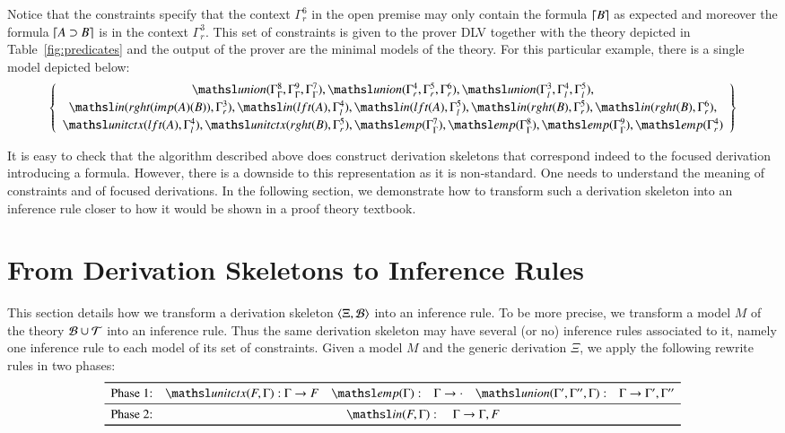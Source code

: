 \documentclass[a4paper,10pt]{article}
\newcommand\thSeq{\ensuremath{\Tscr}}
\newcommand{\elin}[2]{\ensuremath{{\tsl{unitctx}(\ensuremath{#1}, \ensuremath{#2})}}}
\newcommand{\emp}[1]{\ensuremath{{\tsl{emp}(\ensuremath{#1})}}}
\newcommand{\union}[3]{\ensuremath{{\tsl{union}(\ensuremath{#1},\ensuremath{#2},\ensuremath{ #3})}}}
\newcommand{\In}[2]{\ensuremath{\tsl{in}(\ensuremath{#1},\ensuremath{#2})}}
\begin{document}
Notice that the constraints specify that the context $\Gamma^6_r$ in the open premise 
may only contain the formula $\lceil B \rceil$ as expected and moreover the formula $\lceil A \supset B \rceil$ is in the context
$\Gamma^3_r$. This set of constraints is given to the prover DLV together with the theory depicted in Table~\ref{fig:predicates} and the 
output of the prover are the minimal models of the theory. For this particular example, there is a single model depicted below:
\[
 \left\{\begin{array}{c}
\union{\Gamma_{\Gamma}^{8}}{\Gamma_{\Gamma}^{9}}{ \Gamma_{\Gamma}^{7}}, 
\union{\Gamma_{r}^{4}}{\Gamma_{r}^{5}}{\Gamma_{r}^{6}}, \union{\Gamma_{l}^{3}}{ \Gamma_{l}^{4}}{ \Gamma_{l}^{5}},\\[2pt]
\In{rght (imp (A) (B) )}{\Gamma_{r}^{3}}, \In{lft (A)} {\Gamma_{l}^{4}},
\In{lft (A)} {\Gamma_{l}^{5}},\In{rght (B) }{ \Gamma_{r}^{5}},\In { rght (B)} { \Gamma_{r}^{6}},\\[2pt]
\elin{ lft (A) }{ \Gamma_{l}^{4}}, \elin{rght (B)}{ \Gamma_{r}^{5}}, 
\emp{\Gamma_{\Gamma}^{7}},\emp{\Gamma_{\Gamma}^{8}},\emp{\Gamma_{\Gamma}^{9}},\emp{\Gamma_{r}^{4}}
        \end{array}
 \right\}
\]
 
It is easy to check that the algorithm described above does construct derivation
skeletons that correspond indeed to the focused derivation introducing a
formula. However, there is a downside to this representation as it is
non-standard. One needs to understand the meaning of constraints and of focused
derivations.  In the following section, we demonstrate how to transform such a
derivation skeleton into an inference rule closer to how it would be shown in a
proof theory textbook.

\section{From Derivation Skeletons to Inference Rules}

This section details how we transform a derivation skeleton $\langle\Xi, {\cal B}\rangle$
into an inference rule. To be more precise, we transform a model $M$ of the theory $\Bscr \cup \thSeq$
into an inference rule. Thus the same derivation skeleton may have several (or no) inference rules associated 
to it, namely one inference rule to each model of its set of constraints. Given a model $M$ and the generic
derivation $\Xi$, we apply the following rewrite rules in two phases:
\[
\begin{array}{l@{\quad}r@{~}l@{\quad}r@{\quad}l@{\quad}r@{\quad}l}
\toprule
{\textrm{Phase 1:}} 
& \elin{F}{\Gamma}:  & \Gamma \rightarrow F 
& \emp{\Gamma}: & \Gamma \rightarrow \cdot 
& \union{\Gamma'}{\Gamma''}{\Gamma}: & \Gamma \rightarrow \Gamma',
\Gamma''\\
\midrule
\textrm{Phase 2:} & \multicolumn{6}{c}{
\In{F}{\Gamma}: \quad \Gamma \rightarrow \Gamma, F
}\\
\bottomrule
\end{array}
\]
\end{document}
